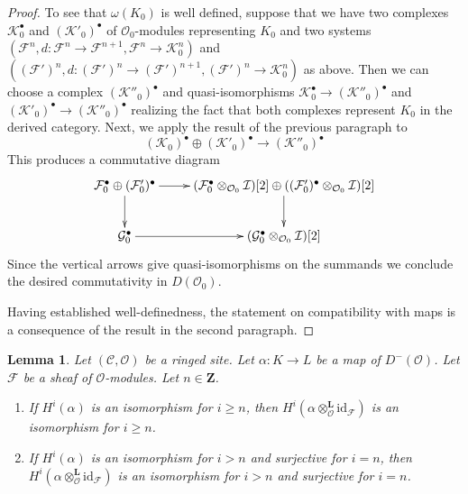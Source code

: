 \documentclass{stacks-project}
\theoremstyle{plain}
\newtheorem{lemma}[subsection]{Lemma}
\theoremstyle{definition}
\theoremstyle{remark}
\numberwithin{equation}{subsection}
\begin{document}
\begin{proof}
\medskip\noindent
To see that $\omega(K_0)$ is well defined, suppose that we have two complexes
$\mathcal{K}_0^\bullet$ and $(\mathcal{K}'_0)^\bullet$
of $\mathcal{O}_0$-modules representing $K_0$ and two systems
$(\mathcal{F}^n, d : \mathcal{F}^n \to \mathcal{F}^{n + 1},
\mathcal{F}^n \to \mathcal{K}_0^n)$
and
$((\mathcal{F}')^n, d : (\mathcal{F}')^n \to (\mathcal{F}')^{n + 1},
(\mathcal{F}')^n \to \mathcal{K}_0^n)$
as above. Then we can choose a complex $(\mathcal{K}''_0)^\bullet$
and quasi-isomorphisms
$\mathcal{K}_0^\bullet  \to (\mathcal{K}''_0)^\bullet$
and
$(\mathcal{K}'_0)^\bullet  \to (\mathcal{K}''_0)^\bullet$
realizing the fact that both complexes represent $K_0$ in the
derived category. Next, we apply the result of the previous paragraph
to
$$
(\mathcal{K}_0)^\bullet \oplus (\mathcal{K}'_0)^\bullet
\longrightarrow
(\mathcal{K}''_0)^\bullet
$$
This produces a commutative diagram
$$
\xymatrix{
\mathcal{F}_0^\bullet \oplus (\mathcal{F}'_0)^\bullet
\ar[d] \ar[r] &
(\mathcal{F}_0^\bullet \otimes_{\mathcal{O}_0} \mathcal{I})[2] \oplus
((\mathcal{F}'_0)^\bullet \otimes_{\mathcal{O}_0} \mathcal{I})[2] \ar[d] \\
\mathcal{G}_0^\bullet \ar[r] &
(\mathcal{G}_0^\bullet \otimes_{\mathcal{O}_0} \mathcal{I})[2]
}
$$
Since the vertical arrows give quasi-isomorphisms on the summands
we conclude the desired commutativity in $D(\mathcal{O}_0)$.

\medskip\noindent
Having established well-definedness, the statement on compatibility
with maps is a consequence of the result in the second
paragraph.
\end{proof}

\begin{lemma}
\label{lemma-induced-map}
Let $(\mathcal{C}, \mathcal{O})$ be a ringed site.
Let $\alpha : K \to L$ be a map of $D^-(\mathcal{O})$.
Let $\mathcal{F}$ be a sheaf of $\mathcal{O}$-modules.
Let $n \in \mathbf{Z}$.
\begin{enumerate}
\item If $H^i(\alpha)$ is an isomorphism for $i \geq n$,
then $H^i(\alpha \otimes_\mathcal{O}^\mathbf{L} \text{id}_\mathcal{F})$
is an isomorphism for $i \geq n$.
\item If $H^i(\alpha)$ is an isomorphism for $i > n$ 
and surjective for $i = n$,
then $H^i(\alpha \otimes_\mathcal{O}^\mathbf{L} \text{id}_\mathcal{F})$
is an isomorphism for $i > n$ and surjective for $i = n$.
\end{enumerate}
\end{lemma}
\end{document}
